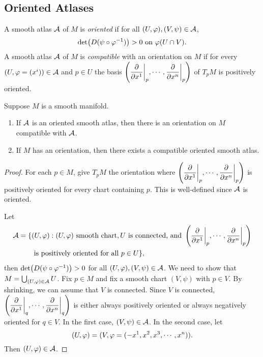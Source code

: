 \subsection{Oriented Atlases}
\begin{definition}
    A smooth atlas $\mathcal{A}$ of $M$ is \textit{oriented} if for all $(U,\varphi),(V,\psi) \in \mathcal{A}$, 
    $$\det(D(\psi \circ \varphi^{-1})) > 0 \text{ on }\varphi(U \cap V). $$
    A smooth atlas $\mathcal{A}$ of $M$ is \textit{compatible} with an orientation on $M$ if for every $(U,\varphi=(x^i)) \in \mathcal{A}$ and $p \in U$ the basis $\displaystyle{\left(\pdv{}{x^1}\bigg|_{p}, \cdots, \pdv{}{x^n}\bigg|_{p}\right)}$ of $T_pM$ is positively oriented. 
\end{definition}
\begin{proposition}\label{15.6}
    Suppose $M$ is a smooth manifold.
    \begin{enumerate}
    \item If $\mathcal{A}$ is an oriented smooth atlas, then there is an orientation on $M$ compatible with $\mathcal{A}$.
    \item If $M$ has an orientation, then there exists a compatible oriented smooth atlas. 
    \end{enumerate}
\end{proposition}
\begin{proof}
    For each $p \in M$, give $T_pM$ the orientation where $\displaystyle{\left(\pdv{}{x^1}\bigg|_{p}, \cdots, \pdv{}{x^n}\bigg|_{p}\right)}$ is positively oriented for every chart containing $p$. This is well-defined since $\mathcal{A}$ is oriented. 

    Let 
    \begin{align*}
    \mathcal{A} = \{
    &(U,\varphi): (U,\varphi) \text{ smooth chart}, U \text{ is connected, and }
    \left(\pdv{}{x^1}\bigg|_{p}, \cdots, \pdv{}{x^n}\bigg|_{p}\right) \\
    &\text{ is positively oriented for all }p \in U
    \},
    \end{align*}
    then $\det (D(\psi \circ \varphi^{-1})) > 0$ for all $(U,\varphi),(V,\psi) \in \mathcal{A}$. We need to show that $M = \bigcup_{(U,\varphi) \in \mathcal{A}}U$. 
    Fix $p \in M$ and fix a smooth chart $(V,\psi)$ with $p \in V$. By shrinking, we can assume that $V$ is connected. Since $V$ is connected, 
    $\displaystyle{\left(\pdv{}{x^1}\bigg|_{q}, \cdots, \pdv{}{x^n}\bigg|_{q}\right)}$ is either always positively oriented or always negatively oriented for $q \in V$. In the first case, $(V,\psi) \in \mathcal{A}$. In the second case, let 
    $$(U,\varphi) = (V,\varphi = (-x^1,x^2,x^3,\cdots,x^n)). $$
    Then $(U,\varphi) \in \mathcal{A}$. 
\end{proof}
